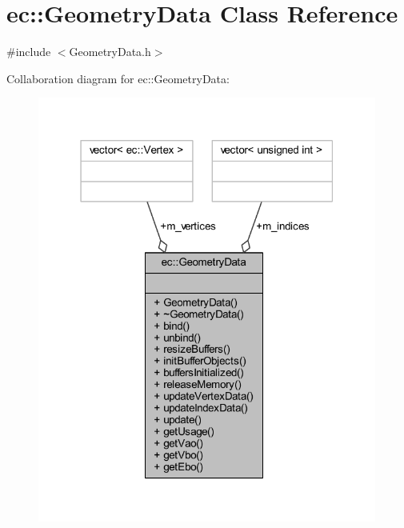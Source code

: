 \hypertarget{classec_1_1_geometry_data}{}\section{ec\+:\+:Geometry\+Data Class Reference}
\label{classec_1_1_geometry_data}


{\ttfamily \#include $<$Geometry\+Data.\+h$>$}



Collaboration diagram for ec\+:\+:Geometry\+Data\+:\nopagebreak
\begin{figure}[H]
\begin{center}
\leavevmode
\includegraphics[width=316pt]{classec_1_1_geometry_data__coll__graph}
\end{center}
\end{figure}
